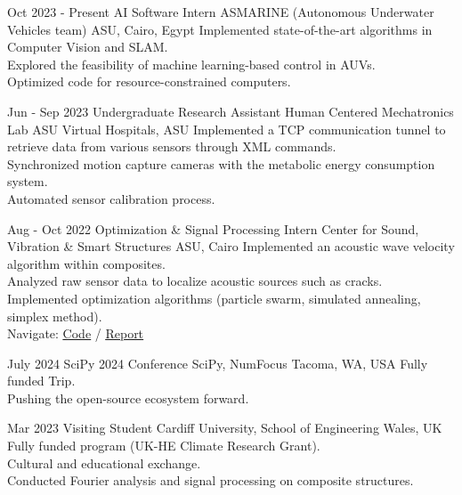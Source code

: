 \documentclass[hidelinks]{report}
\begin{document}
\entry
    {Oct 2023 - Present }
    {AI Software Intern}
    {ASMARINE (Autonomous Underwater Vehicles team)}
    {ASU, Cairo, Egypt}
    {
      \textbullet Implemented state-of-the-art algorithms in Computer Vision and SLAM. \\
      \textbullet Explored the feasibility of machine learning-based control in AUVs. \\
      \textbullet Optimized code for resource-constrained computers.
    }

\entry
    {Jun - Sep 2023}
    {Undergraduate Research Assistant}
    {Human Centered Mechatronics Lab}
    {ASU Virtual Hospitals, ASU}
    {
      \textbullet Implemented a TCP communication tunnel to retrieve data from various sensors through XML commands. \\
      \textbullet Synchronized motion capture cameras with the metabolic energy consumption system. \\
      \textbullet Automated sensor calibration process.
    }

\entry
    {Aug - Oct 2022}
    {Optimization \& Signal Processing Intern}
    {Center for Sound, Vibration \& Smart Structures}
    {ASU, Cairo}
    {
      \textbullet Implemented an acoustic wave velocity algorithm within composites.\\
      \textbullet Analyzed raw sensor data to localize acoustic sources such as cracks. \\
      \textbullet Implemented optimization algorithms (particle swarm, simulated annealing, simplex method).\\
      \textbullet Navigate: 
      \href{\github/AE-software.git}{\underline{Code}} / %
      \href{\github/AE-software/blob/master/Final-Report/Report.pdf}{\underline{Report}}
    }

\vspace{2mm}


\entry
    {July 2024}
    {SciPy 2024 Conference}  
    {SciPy, NumFocus}
    {Tacoma, WA, USA}
    {
      \textbullet Fully funded Trip.\\
      \textbullet Pushing the open-source ecosystem forward.
    }

\entry
    {Mar 2023}
    {Visiting Student}
    {Cardiff University, School of Engineering}
    {Wales, UK}
    {
      \textbullet Fully funded program (UK-HE Climate Research Grant). \\
      \textbullet Cultural and educational exchange. \\
      \textbullet Conducted Fourier analysis and signal processing on composite structures. \\ 
    }
\end{document}
